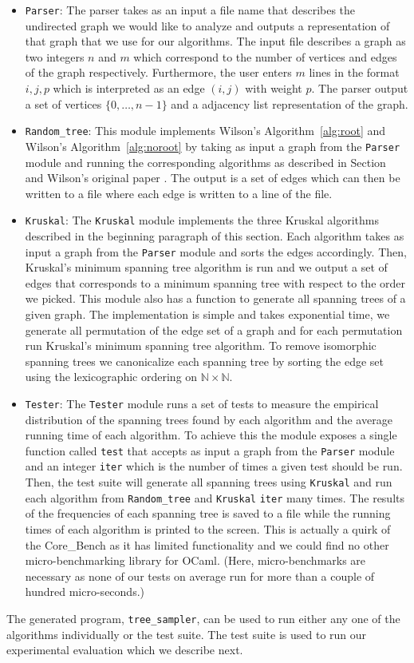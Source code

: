 \documentclass[11pt]{article}
\begin{document}
\begin{itemize}
\item \texttt{Parser}: The parser takes as an input a file name that describes the undirected graph we would like to analyze and outputs a representation of that graph that we use for our algorithms. The input file describes a graph as two integers $n$ and $m$ which correspond to the number of vertices and edges of the graph respectively. Furthermore, the user enters $m$ lines in the format $i,j,p$ which is interpreted as an edge $(i,j)$ with weight $p$. The parser output a set of vertices $\{0,\dots,n-1\}$ and a adjacency list representation of the graph.
\item \texttt{Random\_tree}: This module implements Wilson's Algorithm~\ref{alg:root} and Wilson's Algorithm~\ref{alg:noroot} by taking as input a graph from the \texttt{Parser} module and running the corresponding algorithms as described in Section~\label{wilson} and Wilson's original paper \cite{wilson}. The output is a set of edges which can then be written to a file where each edge is written to a line of the file.
\item \texttt{Kruskal}: The \texttt{Kruskal} module implements the three Kruskal algorithms described in the beginning paragraph of this section. Each algorithm takes as input a graph from the \texttt{Parser} module and sorts the edges accordingly. Then, Kruskal's minimum spanning tree algorithm is run and we output a set of edges that corresponds to a minimum spanning tree with respect to the order we picked. This module also has a function to generate all spanning trees of a given graph. The implementation is simple and takes exponential time, we generate all permutation of the edge set of a graph and for each permutation run Kruskal's minimum spanning tree algorithm. To remove isomorphic spanning trees we canonicalize each spanning tree by sorting the edge set using the lexicographic ordering on $\mathbb{N}\times\mathbb{N}$.
\item \texttt{Tester}: The \texttt{Tester} module runs a set of tests to measure the empirical distribution of the spanning trees found by each algorithm and the average running time of each algorithm. To achieve this the module exposes a single function called \texttt{test} that accepts as input a graph from the \texttt{Parser} module and an integer \texttt{iter} which is the number of times a given test should be run. Then, the test suite will generate all spanning trees using \texttt{Kruskal} and run each algorithm from \texttt{Random\_tree} and \texttt{Kruskal} \texttt{iter} many times. The results of the frequencies of each spanning tree is saved to a file while the running times of each algorithm is printed to the screen. This is actually a quirk of the Core\_Bench as it has limited functionality and we could find no other micro-benchmarking library for OCaml. (Here, micro-benchmarks are necessary as none of our tests on average run for more than a couple of hundred micro-seconds.)
\end{itemize}

The generated program, \texttt{tree\_sampler}, can be used to run either any one of the algorithms individually or the test suite. The test suite is used to run our experimental evaluation which we describe next.

\printbibliography
\end{document}
